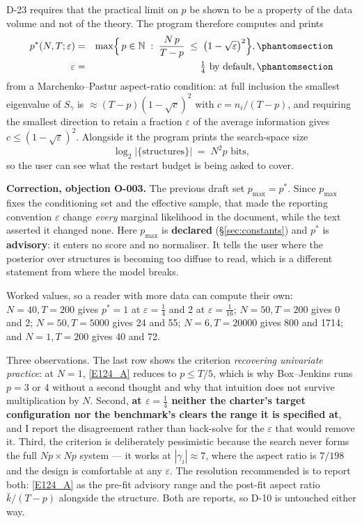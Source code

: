 D-23 requires that the practical limit on $p$ be shown to be a property of the data
volume and not of the theory. The program therefore computes and prints
\begin{eqnarray}
p^*(N,T;\varepsilon) &=& \max\Bigl\{\,p\in\mathbb{N} \;:\;
  \frac{N\,p}{T-p} \;\le\; \bigl(1-\sqrt{\varepsilon}\bigr)^2\Bigr\},
  \Elabel{E-124A}{E124_A} \\
\varepsilon &=& \tfrac14\text{ by default},
  \Elabel{E-124B}{E124_B}
\end{eqnarray}
from a Marchenko--Pastur aspect-ratio condition: at full inclusion the smallest
eigenvalue of $S_\gamma$ is $\approx(T-p)(1-\sqrt{c})^2$ with $c=n_i/(T-p)$, and
requiring the smallest direction to retain a fraction $\varepsilon$ of the average
information gives $c\le(1-\sqrt{\varepsilon})^2$. Alongside it the program prints the
search-space size
\begin{equation}
\log_2\bigl|\{\text{structures}\}\bigr| \;=\; N^2p\text{ bits},
\tag{E-125}\label{E125}
\end{equation}
so the user can see what the restart budget is being asked to cover.

\begin{recordbox}
\textbf{Correction, objection O-003.} The previous draft set $p_{\max}=p^*$. Since
$p_{\max}$ fixes the conditioning set and the effective sample, that made the
reporting convention $\varepsilon$ change \emph{every} marginal likelihood in the
document, while the text asserted it changed none. Here $p_{\max}$ is
\textbf{declared} (\S\ref{sec:constants}) and $p^*$ is \textbf{advisory}: it enters
no score and no normaliser. It tells the user where the posterior over structures is
becoming too diffuse to read, which is a different statement from where the model
breaks.
\end{recordbox}

Worked values, so a reader with more data can compute their own: $N=40,T=200$ gives
$p^*=1$ at $\varepsilon=\frac14$ and 2 at $\varepsilon=\frac1{16}$; $N=50,T=200$
gives 0 and 2; $N=50,T=5000$ gives 24 and 55; $N=6,T=20000$ gives 800 and 1714; and
$N=1,T=200$ gives 40 and 72.

Three observations. The last row shows the criterion \emph{recovering univariate
practice}: at $N=1$, \eqref{E124_A} reduces to $p\le T/5$, which is why Box--Jenkins
runs $p=3$ or 4 without a second thought and why that intuition does not survive
multiplication by $N$. Second, \textbf{at $\varepsilon=\frac14$ neither the charter's
target configuration nor the benchmark's clears the range it is specified at}, and I
report the disagreement rather than back-solve for the $\varepsilon$ that would
remove it. Third, the criterion is deliberately pessimistic because the search never
forms the full $Np\times Np$ system --- it works at $|\gamma_i|\approx7$, where the
aspect ratio is $7/198$ and the design is comfortable at any $\varepsilon$. The
resolution recommended is to report both: \eqref{E124_A} as the pre-fit advisory range
and the post-fit aspect ratio $\bar k/(T-p)$ alongside the structure. Both are
reports, so D-10 is untouched either way.


